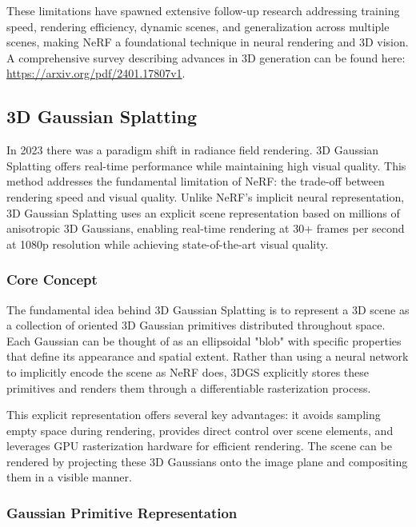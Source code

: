 \documentclass[conference]{IEEEtran}
\begin{document}
These limitations have spawned extensive follow-up research addressing training speed, rendering efficiency, dynamic scenes, and generalization across multiple scenes, making NeRF a foundational technique in neural rendering and 3D vision. A comprehensive survey describing advances in 3D generation can be found here: \url{https://arxiv.org/pdf/2401.17807v1}.

\subsection{3D Gaussian Splatting}

In 2023 there was a paradigm shift in radiance field rendering. 3D Gaussian Splatting offers real-time performance while maintaining high visual quality. This method addresses the fundamental limitation of NeRF: the trade-off between rendering speed and visual quality. Unlike NeRF's implicit neural representation, 3D Gaussian Splatting uses an explicit scene representation based on millions of anisotropic 3D Gaussians, enabling real-time rendering at 30+ frames per second at 1080p resolution while achieving state-of-the-art visual quality.~\cite{3d_gaussian_splatting_paper}

\subsubsection{Core Concept}

The fundamental idea behind 3D Gaussian Splatting is to represent a 3D scene as a collection of oriented 3D Gaussian primitives distributed throughout space. Each Gaussian can be thought of as an ellipsoidal "blob" with specific properties that define its appearance and spatial extent. Rather than using a neural network to implicitly encode the scene as NeRF does, 3DGS explicitly stores these primitives and renders them through a differentiable rasterization process.

This explicit representation offers several key advantages: it avoids sampling empty space during rendering, provides direct control over scene elements, and leverages GPU rasterization hardware for efficient rendering. The scene can be rendered by projecting these 3D Gaussians onto the image plane and compositing them in a visible manner.~\cite{3d_gaussian_splatting_paper_p2}

\subsubsection{Gaussian Primitive Representation}
\end{document}
